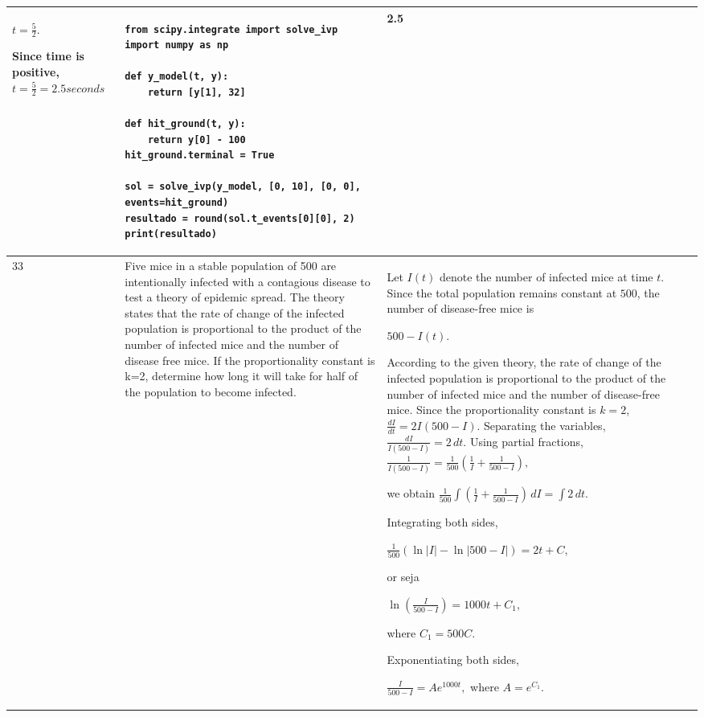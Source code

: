 \documentclass[a4paper,12pt]{article}
\begin{document}
\begin{longtable}{|p{0.3cm}|p{}|p{10cm}|p{}|p{1.5cm}|}
$t=\frac{5}{2}.$

Since time is positive, $ t=\frac{5}{2}=2.5 seconds $
         

 



&\begin{verbatim}
from scipy.integrate import solve_ivp
import numpy as np

def y_model(t, y):
    return [y[1], 32]

def hit_ground(t, y):
    return y[0] - 100
hit_ground.terminal = True

sol = solve_ivp(y_model, [0, 10], [0, 0], events=hit_ground)
resultado = round(sol.t_events[0][0], 2)
print(resultado)
\end{verbatim}&   2.5         \\ \hline
      33           & Five mice in a stable population of 500 are intentionally infected with a contagious disease to test a theory of epidemic spread. The theory states that the rate of change of the infected population is proportional to the product of the number of infected mice and the number of disease free mice. If the proportionality constant is k=2, determine how long it will take for half of the population to become infected.   & Let \(I(t)\) denote the number of infected mice at time \(t\). Since the total population remains constant at \(500\), the number of disease-free mice is

$
500-I(t).$

According to the given theory, the rate of change of the infected population is proportional to the product of the number of infected mice and the number of disease-free mice. Since the proportionality constant is \(k=2\),
$\frac{dI}{dt}=2I(500-I).$
Separating the variables,
$\frac{dI}{I(500-I)}=2\,dt.$
Using partial fractions,
$
\frac{1}{I(500-I)}
=\frac{1}{500}\left(\frac{1}{I}+\frac{1}{500-I}\right),$

we obtain
$
\frac{1}{500}\int\left(\frac{1}{I}+\frac{1}{500-I}\right)\,dI
=\int2\,dt.$

Integrating both sides,

$\frac{1}{500}\left(\ln|I|-\ln|500-I|\right)
=2t+C,$

or seja

$
\ln\left(\frac{I}{500-I}\right)=1000t+C_1,$


where \(C_1=500C\).

Exponentiating both sides,

$\frac{I}{500-I}=Ae^{1000t},$
where \(A=e^{C_1}\).


\end{longtable}
\end{document}
